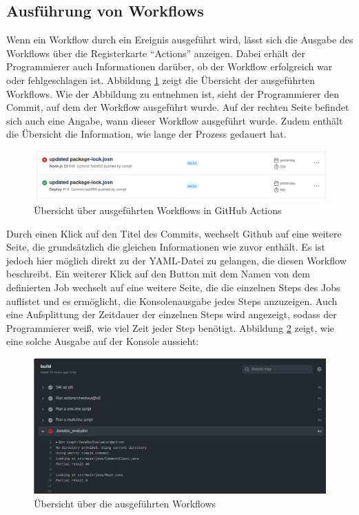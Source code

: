 	\subsection{Ausführung von Workflows}
	Wenn ein Workflow durch ein Ereignis ausgeführt wird, lässt sich die Ausgabe des Workflows über die Registerkarte \enquote{Actions} anzeigen. Dabei erhält der Programmierer auch Informationen darüber, ob der Workflow erfolgreich war oder fehlgeschlagen ist. Abbildung \ref{fig:workflow_overview} zeigt die Übersicht der ausgeführten Workflows. Wie der Abbildung zu entnehmen ist, sieht der Programmierer den Commit, auf dem der Workflow ausgeführt wurde. Auf der rechten Seite befindet sich auch eine Angabe, wann dieser Workflow ausgeführt wurde. Zudem enthält die Übersicht die Information, wie lange der Prozess gedauert hat. 
	\begin{figure}[h]
	    \centering
	    
	    \includegraphics[width=\columnwidth]{figures/workflow_overview.png}
	    \caption{Übersicht über ausgeführten Workflows in GitHub Actions}
	    \label{fig:workflow_overview}
	\end{figure}
	
	Durch einen Klick auf den Titel des Commits, wechselt Github auf eine weitere Seite, die grundsätzlich die gleichen Informationen wie zuvor enthält. Es ist jedoch hier möglich direkt zu der YAML-Datei zu gelangen, die diesen Workflow beschreibt. Ein weiterer Klick auf den Button mit dem Namen von dem definierten Job wechselt auf eine weitere Seite, die die einzelnen Steps des Jobs auflistet und es ermöglicht, die Konsolenausgabe jedes Steps anzuzeigen. Auch eine Aufsplittung der Zeitdauer der einzelnen Steps wird angezeigt, sodass der Programmierer weiß, wie viel Zeit jeder Step benötigt. Abbildung \ref{fig:workflow_output} zeigt, wie eine solche Ausgabe auf der Konsole aussieht:
	\begin{figure}[h]
	    \centering
	    
	    \includegraphics[width=\columnwidth]{figures/workflow_output.png}
	    \caption{Übersicht über die ausgeführten Workflows}
	    \label{fig:workflow_output}
	\end{figure}
